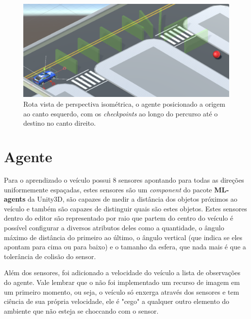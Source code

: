 \begin{figure}[h]
   \centering
   \includegraphics[scale=0.35]{figs/detalhe-rota.png}
    \caption{Rota vista de perspectiva isométrica, o agente posicionado a origem ao canto esquerdo, com os \textit{checkpoints} ao longo do percurso até o destino no canto direito.}
 \end{figure}

 \section{Agente}
 Para o aprendizado o veículo possui 8 sensores apontando para todas as direções uniformemente espaçadas, estes sensores são um \textit{component} do pacote \textbf{ML-agents} da Unity3D, são capazes de medir a distância dos objetos próximos ao veículo e também são capazes de distinguir quais são estes objetos. Estes sensores dentro do editor são representado por raio que partem do centro do veículo é possível configurar a diversos atributos deles como a quantidade, o ângulo máximo de distância do primeiro ao último, o ângulo vertical (que indica se eles apontam para cima ou para baixo) e o tamanho da esfera, que nada mais é que a tolerância de colisão do sensor.

 Além dos sensores, foi adicionado a velocidade do veículo a lista de observações do agente. Vale lembrar que o não foi implementado um recurso de imagem em um primeiro momento, ou seja, o veículo só enxerga através dos sensores e tem ciência de sua própria velocidade, ele é "cego" a qualquer outro elemento do ambiente que não esteja se choccando com o sensor.


